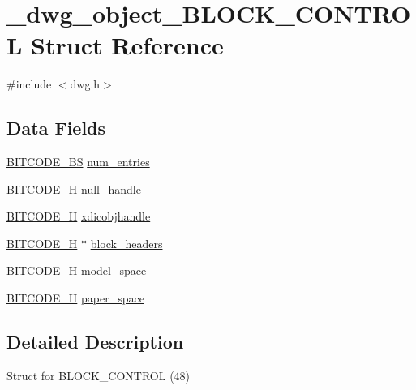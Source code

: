 \hypertarget{struct__dwg__object__BLOCK__CONTROL}{\section{\-\_\-dwg\-\_\-object\-\_\-\-B\-L\-O\-C\-K\-\_\-\-C\-O\-N\-T\-R\-O\-L \-Struct \-Reference}
\label{struct__dwg__object__BLOCK__CONTROL}
}


{\ttfamily \#include $<$dwg.\-h$>$}

\subsection*{\-Data \-Fields}
\begin{DoxyCompactItemize}
\item 
\hyperlink{dwg_8h_a94297606fbd4a4ff97e8add284af0809}{\-B\-I\-T\-C\-O\-D\-E\-\_\-\-B\-S} \hyperlink{struct__dwg__object__BLOCK__CONTROL_ae4c8a7222728a1b5d0acac466b497b29}{num\-\_\-entries}
\item 
\hyperlink{dwg_8h_a7c700e94e047a97ba8c24bdfe4029dc3}{\-B\-I\-T\-C\-O\-D\-E\-\_\-\-H} \hyperlink{struct__dwg__object__BLOCK__CONTROL_a92598a0ed37870222bede3af86f4436c}{null\-\_\-handle}
\item 
\hyperlink{dwg_8h_a7c700e94e047a97ba8c24bdfe4029dc3}{\-B\-I\-T\-C\-O\-D\-E\-\_\-\-H} \hyperlink{struct__dwg__object__BLOCK__CONTROL_acace63de13e4afa4a00f81efedb5a97c}{xdicobjhandle}
\item 
\hyperlink{dwg_8h_a7c700e94e047a97ba8c24bdfe4029dc3}{\-B\-I\-T\-C\-O\-D\-E\-\_\-\-H} $\ast$ \hyperlink{struct__dwg__object__BLOCK__CONTROL_acd0c74153c2827ace49a0fa9794e0a51}{block\-\_\-headers}
\item 
\hyperlink{dwg_8h_a7c700e94e047a97ba8c24bdfe4029dc3}{\-B\-I\-T\-C\-O\-D\-E\-\_\-\-H} \hyperlink{struct__dwg__object__BLOCK__CONTROL_a739a00c752ebc033321affa8479f3464}{model\-\_\-space}
\item 
\hyperlink{dwg_8h_a7c700e94e047a97ba8c24bdfe4029dc3}{\-B\-I\-T\-C\-O\-D\-E\-\_\-\-H} \hyperlink{struct__dwg__object__BLOCK__CONTROL_aec0ec63a477e8bbb5365d8caf6fbe117}{paper\-\_\-space}
\end{DoxyCompactItemize}


\subsection{\-Detailed \-Description}
\-Struct for \-B\-L\-O\-C\-K\-\_\-\-C\-O\-N\-T\-R\-O\-L (48) 

